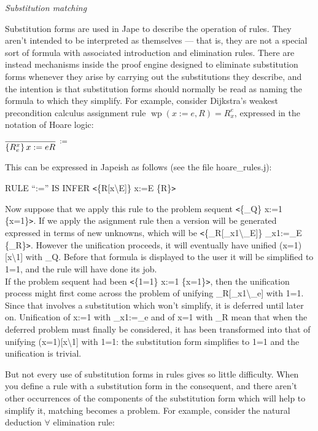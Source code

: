 \textit{Substitution matching}


Substitution forms are used in Jape to describe the operation of rules. They aren't intended to be interpreted as themselves --- that is, they are not a special sort of formula with associated introduction and elimination rules. There are instead mechanisms inside the proof engine designed to eliminate substitution forms whenever they arise by carrying out the substitutions they describe, and the intention is that substitution forms should normally be read as naming the formula to which they simplify. For example, consider Dijkstra's weakest precondition calculus assignment rule $\operatorname{wp}(x:=e,R)=R_{x}^{e} $, expressed in the notation of Hoare logic:


$\infer[\reason{$:=$}]
       {\left\{ R^{x}_{e} \right\} x:=e{R}}
       {}$

This can be expressed in Japeish as follows (see the file hoare\_rules.j):

{\small RULE ``:='' IS INFER \texttt{<}\{R[x{\textbackslash}E]\} x:=E \{R\}\texttt{>}}


Now suppose that we apply this rule to the problem sequent {\small \texttt{<}\{\_Q\} x:=1 \{x=1\}\texttt{>}}. If we apply the asignment rule then a version will be generated expressed in terms of new unknowns, which will be {\small \texttt{<}\{\_R[\_x1{\textbackslash}\_E]\} \_x1:=\_E \{\_R\}\texttt{>}}. However the unification proceeds, it will eventually have unified {\small (x=1)[x{\textbackslash}1]} with {\small \_Q}. Before that formula is displayed to the user it will be simplified to {\small 1=1}, and the rule will have done its job.\\
If the problem sequent had been {\small \texttt{<}\{1=1\} x:=1 \{x=1\}\texttt{>}}, then the unification process might first come across the problem of unifying {\small \_R[\_x1{\textbackslash}\_e]} with {\small 1=1}. Since that involves a substitution which won't simplify, it is deferred until later on. Unification of {\small x:=1} with {\small \_x1:=\_e} and of {\small x=1} with {\small \_R} mean that when the deferred problem must finally be considered, it has been transformed into that of unifying {\small (x=1)[x{\textbackslash}1]} with {\small 1=1}: the substitution form simplifies to {\small 1=1} and the unification is trivial.


But not every use of substitution forms in rules gives so little difficulty. When you define a rule with a substitution form in the consequent, and there aren't other occurrences of the components of the substitution form which will help to simplify it, matching becomes a problem. For example, consider the natural deduction \ensuremath{\forall} elimination rule:


